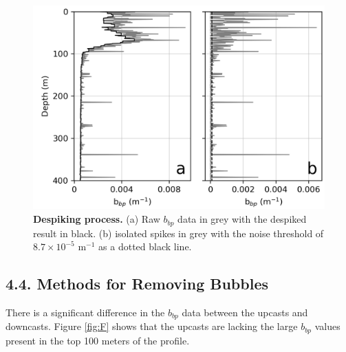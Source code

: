 \documentclass[
	a4paper, %
	10pt, %
	unnumberedsections, %
	twoside, %
]{LTJournalArticle}
\begin{document}
\begin{multicols}{2}
\begin{figure}[H] %
	\includegraphics[width=\linewidth]{Louis/figures/figureD.png}
	\caption{\textbf{Despiking process.} (a) Raw $b_{bp}$ data in grey with the despiked result in black. (b) isolated spikes in grey with the noise threshold of $8.7 \times 10^{-5} $ m$^{-1}$ as a dotted black line.}
	\label{fig:D}
\end{figure}


\subsection{4.4. Methods for Removing Bubbles}
There is a significant difference in the $b_{bp}$ data between the upcasts
and downcasts. Figure \ref{fig:F} shows that the upcasts are lacking the large $b_{bp}$ values present in the top 100
meters of the profile.



\end{multicols}
\end{document}
